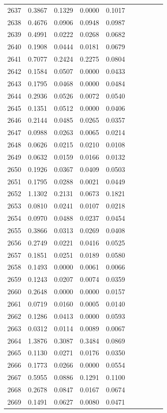 \begin{table}
\begin{tabular}{cccccccccc}
2637& 0.3867& 0.1329& 0.0000& 0.1017\\ 
2638& 0.4676& 0.0906& 0.0948& 0.0987\\ 
2639& 0.4991& 0.0222& 0.0268& 0.0682\\ 
2640& 0.1908& 0.0444& 0.0181& 0.0679\\ 
2641& 0.7077& 0.2424& 0.2275& 0.0804\\ 
2642& 0.1584& 0.0507& 0.0000& 0.0433\\ 
2643& 0.1795& 0.0468& 0.0000& 0.0484\\ 
2644& 0.2936& 0.0526& 0.0072& 0.0540\\ 
2645& 0.1351& 0.0512& 0.0000& 0.0406\\ 
2646& 0.2144& 0.0485& 0.0265& 0.0357\\ 
2647& 0.0988& 0.0263& 0.0065& 0.0214\\ 
2648& 0.0626& 0.0215& 0.0210& 0.0108\\ 
2649& 0.0632& 0.0159& 0.0166& 0.0132\\ 
2650& 0.1926& 0.0367& 0.0409& 0.0503\\ 
2651& 0.1795& 0.0288& 0.0021& 0.0449\\ 
2652& 1.1302& 0.2131& 0.0673& 0.1821\\ 
2653& 0.0810& 0.0241& 0.0107& 0.0218\\ 
2654& 0.0970& 0.0488& 0.0237& 0.0454\\ 
2655& 0.3866& 0.0313& 0.0269& 0.0408\\ 
2656& 0.2749& 0.0221& 0.0416& 0.0525\\ 
2657& 0.1851& 0.0251& 0.0189& 0.0580\\ 
2658& 0.1493& 0.0000& 0.0061& 0.0066\\ 
2659& 0.1243& 0.0207& 0.0074& 0.0359\\ 
2660& 0.2648& 0.0000& 0.0000& 0.0157\\ 
2661& 0.0719& 0.0160& 0.0005& 0.0140\\ 
2662& 0.1286& 0.0413& 0.0000& 0.0593\\ 
2663& 0.0312& 0.0114& 0.0089& 0.0067\\ 
2664& 1.3876& 0.3087& 0.3484& 0.0869\\ 
2665& 0.1130& 0.0271& 0.0176& 0.0350\\ 
2666& 0.1773& 0.0266& 0.0000& 0.0554\\ 
2667& 0.5955& 0.0886& 0.1291& 0.1100\\ 
2668& 0.2678& 0.0847& 0.0167& 0.0674\\ 
2669& 0.1491& 0.0627& 0.0080& 0.0471\\ 

\end{tabular}
\end{table}
